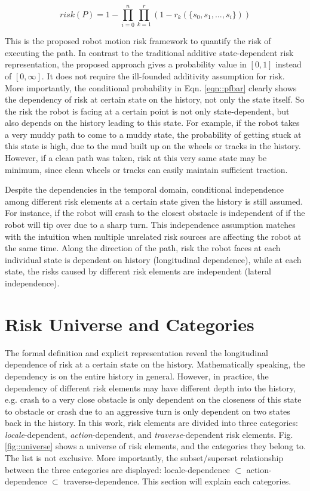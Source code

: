 \documentclass[letterpaper]{article} %
\begin{document}
\begin{equation}
risk(P) = 1 - \prod_{i=0}^{n} \prod_{k=1}^{r} (1-r_k(\{s_0, s_1, ..., s_i\}))
\label{eqn::risk_representation}
\end{equation}

This is the proposed robot motion risk framework to quantify the risk of executing the path. In contrast to the traditional additive state-dependent risk representation, the proposed approach gives a probability value in $[0, 1]$ instead of $[0, \infty]$. It does not require the ill-founded additivity assumption for risk. More importantly, the conditional probability in Eqn. \ref{eqn::pfbar} clearly shows the dependency of risk at certain state on the history, not only the state itself. So the risk the robot is facing at a certain point is not only state-dependent, but also depends on the history leading to this state. For example, if the robot takes a very muddy path to come to a muddy state, the probability of getting stuck at this state is high, due to the mud built up on the wheels or tracks in the history. However, if a clean path was taken, risk at this very same state may be minimum, since clean wheels or tracks can easily maintain sufficient traction.

Despite the dependencies in the temporal domain, conditional independence among different risk elements at a certain state given the history is still assumed. For instance, if the robot will crash to the closest obstacle is independent of if the robot will tip over due to a sharp turn. This independence assumption matches with the intuition when multiple unrelated risk sources are affecting the robot at the same time. Along the direction of the path, risk the robot faces at each individual state is dependent on history (longitudinal dependence), while at each state, the risks caused by different risk elements are independent (lateral independence).


\section{Risk Universe and Categories}
The formal definition and explicit representation reveal the longitudinal dependence of risk at a certain state on the history. Mathematically speaking, the dependency is on the entire history in general. However, in practice, the dependency of different risk elements may have different depth into the history, e.g. crash to a very close obstacle is only dependent on the closeness of this state to obstacle or crash due to an aggressive turn is only dependent on two states back in the history. In this work, risk elements are divided into three categories: \emph{locale}-dependent, \emph{action}-dependent, and \emph{traverse}-dependent risk elements. Fig. \ref{fig::universe} shows a universe of risk elements, and the categories they belong to. The list is not exclusive. More importantly, the subset/superset relationship between the three categories are displayed: locale-dependence $\subset$ action-dependence $\subset$ traverse-dependence. This section will explain each categories.
\end{document}

